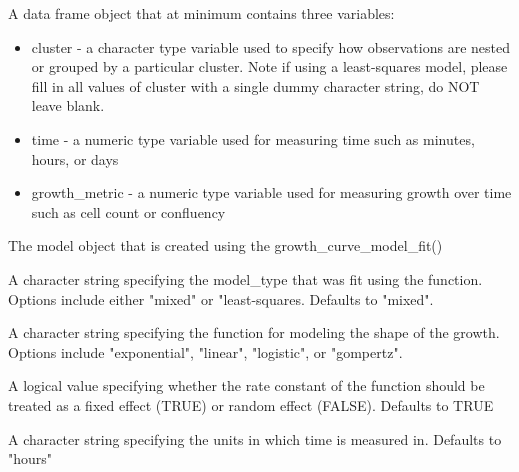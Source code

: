 \documentclass[a4paper]{book}
\begin{document}
\begin{Arguments}
\begin{ldescription}
\item[\code{data\_frame}] A data frame object that at minimum contains three
variables:
\begin{itemize}

\item{} cluster - a character type variable used to specify how observations
are nested or grouped by a particular cluster. Note if using a
least-squares model, please fill in all values of cluster with a single
dummy character string, do NOT leave blank.
\item{} time - a numeric type variable used for measuring time such as
minutes, hours, or days
\item{} growth\_metric - a numeric type variable used for measuring growth
over time such as cell count or confluency

\end{itemize}


\item[\code{growth\_model\_object}] The model object that is created using
the growth\_curve\_model\_fit()

\item[\code{model\_type}] A character string specifying the model\_type that was
fit using the  function. Options
include either "mixed" or "least-squares. Defaults to "mixed".

\item[\code{function\_type}] A character string specifying the function for
modeling the shape of the growth. Options include "exponential", "linear",
"logistic", or "gompertz".

\item[\code{fixed\_rate}] A logical value specifying whether the rate constant
of the function should be treated as a fixed effect (TRUE) or random
effect (FALSE). Defaults to TRUE

\item[\code{time\_unit}] A character string specifying the units in which time is
measured in. Defaults to "hours"
\end{ldescription}
\end{Arguments}
%
\end{document}
